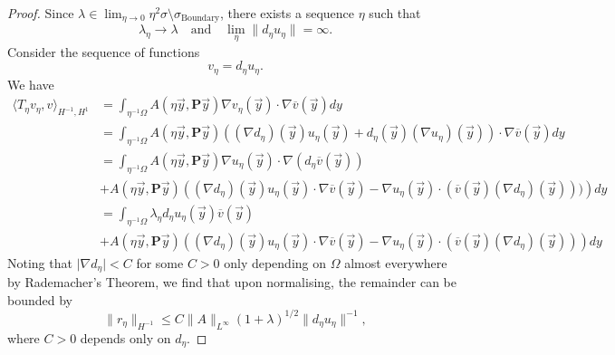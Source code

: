 \documentclass[a4paper,reqno]{amsart}
\numberwithin{equation}{section}
\numberwithin{equation}{section}		%
\numberwithin{figure}{section}			%
\numberwithin{table}{section}				%
\theoremstyle{definition}
\newcommand{\<}{\ensuremath \leq}
\renewcommand{\>}{\ensuremath \geq}
\begin{document}
\begin{proof}
    Since $\lambda\in\lim_{\eta\rightarrow0}\eta^{2}\sigma\setminus\sigma_{\text{Boundary}}$, there exists a sequence $\eta$ such that 
    \begin{equation}
         \lambda_\eta\rightarrow\lambda \quad \text{and} \quad \lim_\eta\lVert d_\eta u_\eta\rVert = \infty.
    \end{equation}
    Consider the sequence of functions
    \begin{equation}
        v_\eta = d_\eta u_\eta.
    \end{equation}
    We have
    \begin{equation}
        \begin{aligned}
            \langle T_{\eta}v_\eta,v \rangle_{H^{-1},H^{1}}&=\int_{\eta^{-1}\Omega}A\left( \eta\vec{y}, \textbf{P}\vec{y} \right)\nabla v_\eta(\vec{y}) \cdot \nabla \overline{v}(\vec{y}) dy\\
            &=\int_{\eta^{-1}\Omega}A\left( \eta\vec{y}, \textbf{P}\vec{y} \right)\left((\nabla d_\eta)(\vec{y}) u_\eta(\vec{y}) + d_\eta(\vec{y})(\nabla u_\eta)(\vec{y})\right)\cdot \nabla \overline{v}(\vec{y}) dy\\
            &= \int_{\eta^{-1}\Omega}A\left( \eta\vec{y}, \textbf{P}\vec{y} \right)\nabla u_\eta(\vec{y}) \cdot \nabla (d_\eta\overline{v}(\vec{y}))\\
             & + A\left( \eta\vec{y}, \textbf{P}\vec{y} \right)\left ((\nabla d_\eta)(\vec{y}) u_\eta(\vec{y})\cdot\nabla \overline{v}(\vec{y}) - \nabla u_\eta(\vec{y})\cdot(\overline{v}(\vec{y})(\nabla d_\eta)(\vec{y})))\right)dy\\
             &=\int_{\eta^{-1}\Omega}\lambda_\eta d_\eta u_\eta(\vec{y})\overline{v}(\vec{y})\\ & 
             + A\left( \eta\vec{y}, \textbf{P}\vec{y} \right)\left ((\nabla d_\eta)(\vec{y}) u_\eta(\vec{y})\cdot\nabla \overline{v}(\vec{y}) - \nabla u_\eta(\vec{y})\cdot(\overline{v}(\vec{y})(\nabla d_\eta)(\vec{y}))\right)dy
        \end{aligned}
    \end{equation} 
    Noting that $\lvert \nabla d_\eta\rvert <C$ for some $C>0$ only depending on $\Omega$ almost everywhere by Rademacher's Theorem, we find that upon normalising, the remainder can be bounded by
    \begin{equation}
        \lVert r_\eta \rVert_{H^{-1}}\leq C\lVert A\rVert_{L^\infty}(1 + \lambda)^{1/2}\lVert d_\eta u_\eta\rVert^{-1},
    \end{equation}
    where $C>0$ depends only on $d_\eta$.
\end{proof}
\end{document}
